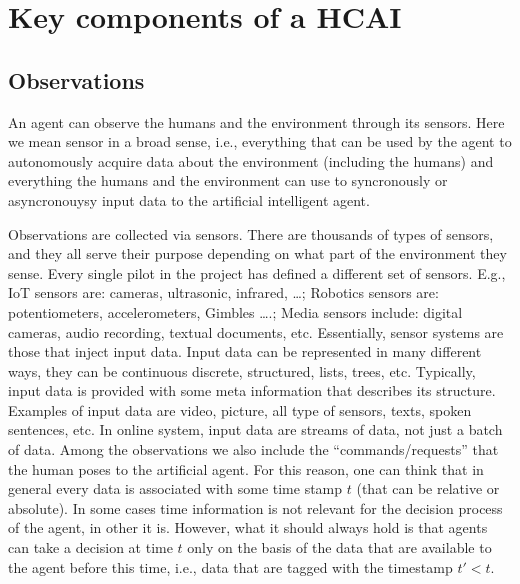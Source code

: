 \section{Key components of a HCAI } 

\subsection{Observations}





An agent can observe the humans and the environment through its
sensors. Here we mean sensor in a broad sense, i.e., everything that
can be used by the agent to autonomously acquire data about the
environment (including the humans) and everything the humans and the
environment can use to syncronously or asyncronouysy input data to the
artificial intelligent agent.

Observations are collected via
sensors. There are thousands of types of sensors, and they all serve
their purpose depending on what part of the environment they
sense. Every single pilot in the project has defined a different set
of sensors. E.g., IoT sensors are: cameras, ultrasonic, infrared,
\dots; Robotics sensors are: potentiometers, accelerometers, Gimbles
\dots.; Media sensors include: digital cameras, audio recording,
textual documents, etc.  Essentially, sensor systems are those that
inject input data. Input data can be represented in many different
ways, they can be continuous discrete, structured, lists, trees,
etc. Typically, input data is provided with some meta information that
describes its structure.  Examples of input data are video, picture,
all type of sensors, texts, spoken sentences, etc. In online system,
input data are streams of data, not just a batch of data. Among the
observations we also include the ``commands/requests'' that the human
poses to the artificial agent.  For this reason, one can think that in
general every data is associated with some time stamp $t$ (that can be
relative or absolute). In some cases time information is not relevant
for the decision process of the agent, in other it is. However, what
it should always hold is that agents can take a decision at time $t$
only on the basis of the data that are available to the agent before
this time, i.e., data that are tagged with the timestamp $t'< t$.

